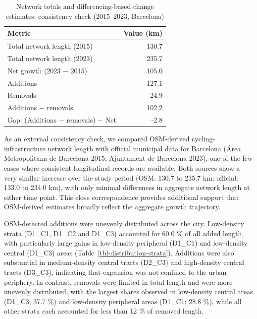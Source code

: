 \documentclass[
]{article}
\begin{document}
{

\begin{longtable}[]{@{}lr@{}}

\caption{\label{tbl-consistency}Network totals and differencing-based
change estimates: consistency check (2015--2023, Barcelona)}

\tabularnewline

\toprule\noalign{}
Metric & Value (km) \\
\midrule\noalign{}
\endhead
\bottomrule\noalign{}
\endlastfoot
Total network length (2015) & 130.7 \\
Total network length (2023) & 235.7 \\
Net growth (2023 − 2015) & 105.0 \\
Additions & 127.1 \\
Removals & 24.9 \\
Additions − removals & 102.2 \\
Gap: (Additions − removals) − Net & -2.8 \\

\end{longtable}

}

\color{black}As an external consistency check, we compared OSM-derived
cycling-infrastructure network length with official municipal data for
Barcelona (Área Metropolitana de Barcelona 2015; Ajuntament de Barcelona
2023), one of the few cases where consistent longitudinal records are
available. Both sources show a very similar increase over the study
period (OSM: 130.7 to 235.7 km; official: 133.0 to 234.0 km), with only
minimal differences in aggregate network length at either time point.
This close correspondence provides additional support that OSM-derived
estimates broadly reflect the aggregate growth trajectory. \color{black}

OSM-detected additions were unevenly distributed across the city.
Low-density strata (D1\_C1, D1\_C2 and D1\_C3) accounted for 60.0 \% of
all added length, with particularly large gains in low-density
peripheral (D1\_C1) and low-density central (D1\_C3) areas
(Table~\ref{tbl-distribution-strata}). Additions were also substantial
in medium-density central tracts (D2\_C3) and high-density central
tracts (D3\_C3), indicating that expansion was not confined to the urban
periphery. In contrast, removals were limited in total length and were
more unevenly distributed, with the largest shares observed in
low-density central areas (D1\_C3; 37.7 \%) and low-density peripheral
areas (D1\_C1; 28.8 \%), while all other strata each accounted for less
than 12 \% of removed length.
\end{document}

